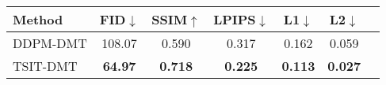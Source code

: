 \begin{table}[ht]
\small
\renewcommand\arraystretch{1}
\centering
\label{tab:ddpm-dmt}
\vspace{-10pt}
\begin{tabular}{l|cccccc}
Method & \textbf{FID$\downarrow$} & \textbf{SSIM$\uparrow$} & \textbf{LPIPS$\downarrow$} & \textbf{L1$\downarrow$} & \textbf{L2$\downarrow$} \\
\hline
DDPM-DMT & 108.07 & 0.590 & 0.317  & 0.162  & 0.059 \\
TSIT-DMT & \bf 64.97 & \bf 0.718 & \bf 0.225  & \bf 0.113  & \bf 0.027 \\
\end{tabular}
\vspace{-10pt}
\end{table}